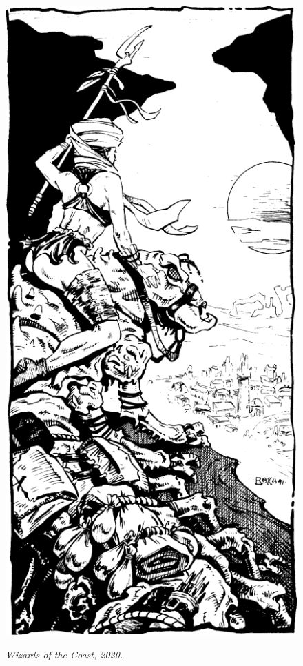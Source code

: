 \begin{figure}[t!]
\centering
\includegraphics[width=\columnwidth]{images/ranger-1.png}
\par\textit{\small\textcopyright Wizards of the Coast, 2020.}
\end{figure}


